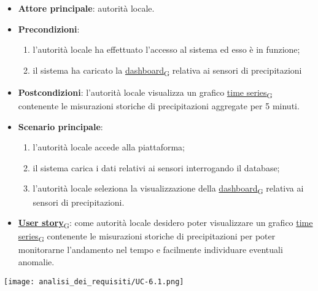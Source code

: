 \newpage

\begin{itemize}
	\item \textbf{Attore principale}: autorità locale.
	\item \textbf{Precondizioni}:
	      \begin{enumerate}
		      \item l'autorità locale ha effettuato l'accesso al sistema ed esso è in funzione;
		      \item il sistema ha caricato la \href{https://7last.github.io/docs/rtb/documentazione-interna/glossario\#dashboard}{dashboard\textsubscript{G}} relativa ai sensori di precipitazioni
	      \end{enumerate}
	\item \textbf{Postcondizioni}: l'autorità locale visualizza un grafico \href{https://7last.github.io/docs/rtb/documentazione-interna/glossario\#time-series}{time series\textsubscript{G}} contenente le misurazioni storiche
	      di precipitazioni aggregate per 5 minuti.
	\item \textbf{Scenario principale}:
	      \begin{enumerate}
		      \item l'autorità locale accede alla piattaforma;
		      \item il sistema carica i dati relativi ai sensori interrogando il database;
		      \item l'autorità locale seleziona la visualizzazione della \href{https://7last.github.io/docs/rtb/documentazione-interna/glossario\#dashboard}{dashboard\textsubscript{G}} relativa ai sensori di precipitazioni.
	      \end{enumerate}
	\item \href{https://7last.github.io/docs/rtb/documentazione-interna/glossario\#user-story}{\textbf{User story}\textsubscript{G}}:
	      come autorità locale desidero poter visualizzare un grafico \href{https://7last.github.io/docs/rtb/documentazione-interna/glossario\#time-series}{time series\textsubscript{G}} contenente le misurazioni storiche
	      di precipitazioni per poter monitorarne l'andamento nel tempo e facilmente individuare eventuali anomalie.
\end{itemize}
\begin{center}
	\texttt{[image: analisi\_dei\_requisiti/UC-6.1.png]}
\end{center}

